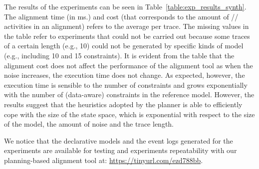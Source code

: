The results of the experiments can be seen in Table~\ref{table:exp_results_synth}. The alignment time (in ms.) and cost (that corresponds to the amount of // activities in an alignment) refers to the average per trace. The missing values in the table refer to experiments that could not be carried out because
some traces of a certain length (e.g., 10) could not be generated by specific kinds of model (e.g., including 10 and 15 constraints). It is evident from the table that the alignment cost does not affect the performance of the alignment tool as when the noise increases, the execution time does not change. As expected, however, the execution time is sensible to the number of constraints and grows exponentially with the number of (data-aware) constraints in the reference model. However, the results suggest that the heuristics adopted by the planner is able to efficiently cope with the size of the state space, which is exponential with respect to the size of the model, the amount of noise and the trace length.

We notice that the declarative models and the event logs generated for the experiments are available for testing and experiments repeatability with our planning-based alignment tool at: \url{https://tinyurl.com/ezd788bb}.

%
%

